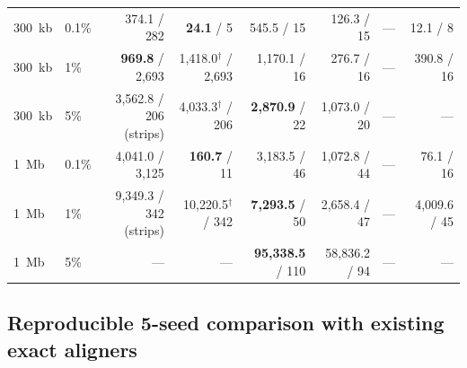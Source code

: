 \documentclass[11pt,a4paper]{article}
\begin{document}
\begin{table}[t]
\begin{tabular}{@{}llrrrrrr@{}}
300~kb & 0.1\% & 374.1 / 282 & \textbf{24.1} / 5 & 545.5 / 15 & 126.3 / 15 & --- & 12.1 / 8 \\
300~kb & 1\% & \textbf{969.8} / 2,693 & 1,418.0$^{\dagger}$ / 2,693 & 1,170.1 / 16 & 276.7 / 16 & --- & 390.8 / 16 \\
300~kb & 5\% & 3,562.8 / 206 (strips) & 4,033.3$^{\dagger}$ / 206 & \textbf{2,870.9} / 22 & 1,073.0 / 20 & --- & --- \\
1~Mb & 0.1\% & 4,041.0 / 3,125 & \textbf{160.7} / 11 & 3,183.5 / 46 & 1,072.8 / 44 & --- & 76.1 / 16 \\
1~Mb & 1\% & 9,349.3 / 342 (strips) & 10,220.5$^{\dagger}$ / 342 & \textbf{7,293.5} / 50 & 2,658.4 / 47 & --- & 4,009.6 / 45 \\
1~Mb & 5\% & --- & --- & \textbf{95,338.5} / 110 & 58,836.2 / 94 & --- & --- \\
\bottomrule
\end{tabular}
\end{table}

\subsection{Reproducible 5-seed comparison with existing exact aligners}
\end{document}
